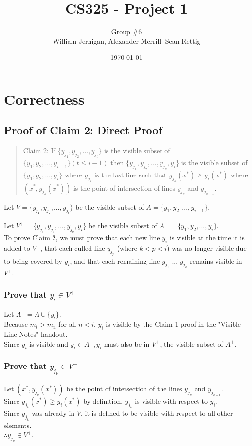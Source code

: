 \documentclass{article}
\title{CS325 - Project 1}
\author{Group \#6 \\ William Jernigan, Alexander Merrill, Sean Rettig}
\date{\today}
\begin{document}
\maketitle

\section*{Correctness}
\subsection*{Proof of Claim 2: Direct Proof}

\begin{quote}
Claim 2: If $\{y_{j_1}, y_{j_2},...,y_{j_{t}}\}$ is the visible subset of $\{y_1, y_2,...,y_{i - 1}\} (t \leq i - 1)$ then $\{y_{j_1}, y_{j_2},...,y_{j_{k}}, y_i\}$ is the visible subset of $\{y_1, y_2,...,y_{i}\}$ where $y_{j_{k}}$ is the last line such that $y_{j_{k}} (x^*) \geq y_i (x^*)$ where $(x^*, y_{j_{k}}(x^*))$ is the point of intersection of lines $y_{j_{k}}$ and $y_{j_{k - 1}}$.
\end{quote}

Let $V=\{y_{j_1}, y_{j_2},...,y_{j_{t}}\}$ be the visible subset of $A=\{y_1, y_2,...,y_{i - 1}\}$.

Let $V^+=\{y_{j_1}, y_{j_2},...,y_{j_{k}}, y_i\}$ be the visible subset of $A^+=\{y_1, y_2,...,y_{i}\}$.\\

To prove Claim 2, we must prove that each new line $y_i$ is visible at the time it is added to $V^+$, that each culled line $y_{j_p}$ (where $k < p < i$) was no longer visible due to being covered by $y_i$, and that each remaining line $y_{j_1}$ ... $y_{j_k}$ remains visible in $V^+$.

\subsubsection*{Prove that $y_{i} \in V^+$}
Let $A^+ = A \cup \{y_i\}$.\\
Because $m_i > m_n$ for all $n < i$, $y_i$ is visible by the Claim 1 proof in the "Visible Line Notes" handout.\\
Since $y_i$ is visible and $y_i \in A^+, y_i$ must also be in $V^+$, the visible subset of $A^+$.

\subsubsection*{Prove that $y_{j_k} \in V^+$}
Let $(x^*, y_{j_k} (x^*))$ be the point of intersection of the lines $y_{j_k}$ and $y_{j_{k-1}}$.\\
Since $y_{j_k} (x^*) \geq y_i (x^*)$ by definition, $y_{j_k}$ is visible with respect to $y_i$.\\
Since $y_{j_k}$ was already in $V$, it is defined to be visible with respect to all other elements.\\
$\therefore y_{j_k} \in V^+$.
\end{document}
